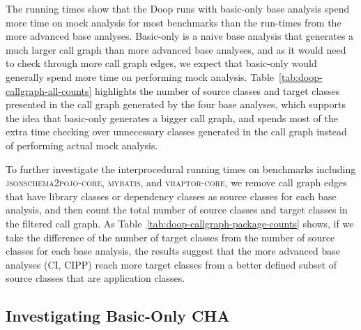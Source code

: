 The running times show that the Doop runs with basic-only base analysis spend more time on mock analysis for most benchmarks than the run-times from the more advanced base analyses. Basic-only is a naive base analysis that generates a much larger call graph than more advanced base analyses, and as it would need to check through more call graph edges, we expect that basic-only would generally spend more time on performing mock analysis. Table~\ref{tab:doop-callgraph-all-counts} highlights the number of source classes and target classes presented in the call graph generated by the four base analyses, which supports the idea that basic-only generates a bigger call graph, and spends most of the extra time checking over unnecessary classes generated in the call graph instead of performing actual mock analysis.

To further investigate the interprocedural running times on benchmarks including \textsc{jsonschema2pojo-core}, \textsc{mybatis}, and \textsc{vraptor-core}, we remove call graph edges that have library classes or dependency classes as source classes for each base analysis, and then count the total number of source classes and target classes in the filtered call graph. As Table~\ref{tab:doop-callgraph-package-counts} shows, if we take the difference of the number of target classes from the number of source classes for each base analysis, the results suggest that the more advanced base analyses (CI, CIPP) reach more target classes from a better defined subset of source classes that are application classes. 

\subsection{Investigating Basic-Only CHA}
\label{subsec:basic-only-cha}

